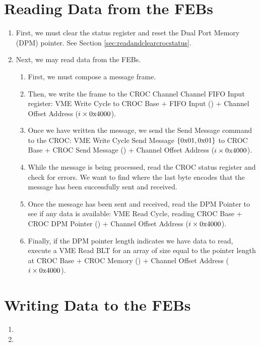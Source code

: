 \section{Reading Data from the FEBs}
\label{sec:readfromfebs}

\begin{enumerate}
\item First, we must clear the status register and reset the Dual Port Memory (DPM) pointer. See Section \ref{sec:readandclearcrocstatus}.
\item Next, we may read data from the FEBs.
\begin{enumerate}
\item First, we must compose a message frame.
\item Then, we write the frame to the CROC Channel Channel FIFO Input register: VME Write Cycle to CROC Base + FIFO Input () + Channel Offset Address ($i \times 0\text{x}4000$).
\item Once we have written the message, we send the Send Message command to the CROC: VME Write Cycle Send Message $\left\{0\text{x}01,0\text{x}01\right\}$ to CROC Base + CROC Send Message () + Channel Offset Address ($i \times 0\text{x}4000$).
\item While the message is being processed, read the CROC status register and check for errors. We want to find  where the last byte encodes that the message has been successfully sent and received.
\item Once the message has been sent and received, read the DPM Pointer to see if any data is available: VME Read Cycle, reading CROC Base + CROC DPM Pointer () + Channel Offset Address ($i \times 0\text{x}4000$).
\item Finally, if the DPM pointer length indicates we have data to read, execute a VME Read BLT for an array of size equal to the pointer length at CROC Base + CROC Memory () + Channel Offset Address ($i \times 0\text{x}4000$).
\end{enumerate}
\end{enumerate}

\section{Writing Data to the FEBs}
\label{sec:writetofebs}

\begin{enumerate}
\item 
\item 
\end{enumerate}






